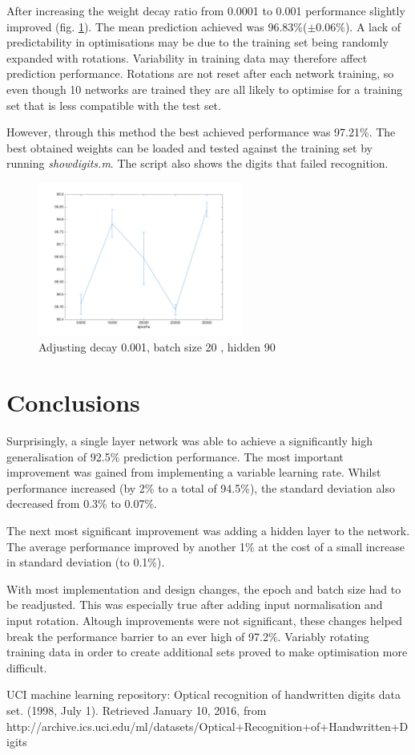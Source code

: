 \documentclass[11]{article}
\begin{document}
After increasing the weight decay ratio from 0.0001 to 0.001 performance slightly improved (fig. \ref{fig:rotations2}). The mean prediction achieved was 96.83\%($\pm 0.06\%$). A lack of predictability in optimisations may be due to the training set being randomly expanded with rotations. Variability in training data may therefore affect prediction performance. Rotations are not reset after each network training, so even though 10 networks are trained they are all likely to optimise for a training set that is less compatible with the test set. 

However, through this method the best achieved performance was 97.21\%. The best obtained weights can be loaded and tested against the training set by running \emph{showdigits.m}. The script also shows the digits that failed recognition. 

\begin{figure}[h]
\centering
\includegraphics[width=0.6\textwidth]{rotations2.png}
\caption{Adjusting decay 0.001, batch size 20 , hidden 90}
\label{fig:rotations2}
\end{figure}

\section{Conclusions}
Surprisingly, a single layer network was able to achieve a significantly high generalisation of 92.5\% prediction performance. The most important improvement was  gained from implementing a variable learning rate. Whilst performance increased (by 2\% to a total of 94.5\%), the standard deviation also decreased from 0.3\% to 0.07\%.

The next most significant improvement was adding a hidden layer to the network. The average performance improved by another 1\% at the cost of a small increase in standard deviation (to 0.1\%).

With most implementation and design changes, the epoch and batch size had to be readjusted. This was especially true after adding input normalisation and input rotation. Altough improvements were not significant, these changes helped break the performance barrier to an ever high of 97.2\%. Variably rotating training data in order to create additional sets proved to make optimisation more difficult. 

\begin{thebibliography}{9}
UCI machine learning repository: Optical recognition of handwritten digits data set. (1998, July 1). Retrieved January 10, 2016, from http://archive.ics.uci.edu/ml/datasets/Optical+Recognition+of+Handwritten+Digits

\end{thebibliography}
\end{document}
